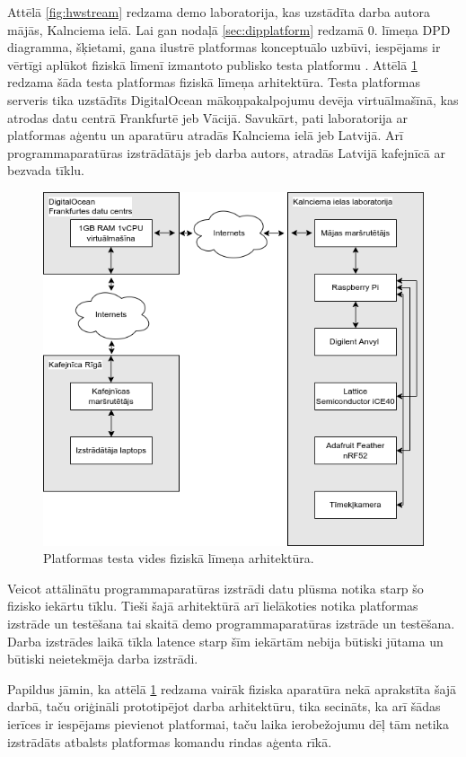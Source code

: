 Attēlā \ref{fig:hwstream} redzama demo laboratorija, kas uzstādīta darba autora
mājās, Kalnciema ielā. Lai gan nodaļā \ref{sec:dipplatform} redzamā 0. līmeņa DPD
diagramma, šķietami, gana ilustrē platformas konceptuālo uzbūvi, iespējams ir
vērtīgi aplūkot fiziskā līmenī izmantoto publisko testa platformu
\cite{VeinbahsKrisjanisProduction}. Attēlā \ref{fig:production} redzama šāda
testa platformas fiziskā līmeņa arhitektūra. Testa platformas serveris tika
uzstādīts DigitalOcean mākoņpakalpojumu devēja virtuālmašīnā, kas atrodas datu
centrā Frankfurtē jeb Vācijā. Savukārt, pati laboratorija ar platformas aģentu
un aparatūru atradās Kalnciema ielā jeb Latvijā. Arī programmaparatūras
izstrādātājs jeb darba autors, atradās Latvijā kafejnīcā ar bezvada tīklu.

\begin{figure}[H]
    \includegraphics[width=0.8\linewidth]{assets/production.drawio.png}
    \centering
    \caption{Platformas testa vides fiziskā līmeņa arhitektūra.}
    \label{fig:production}
\end{figure}

Veicot attālinātu programmaparatūras izstrādi datu plūsma notika starp šo
fizisko iekārtu tīklu. Tieši šajā arhitektūrā arī lielākoties notika platformas
izstrāde un testēšana tai skaitā demo programmaparatūras izstrāde un testēšana.
Darba izstrādes laikā tīkla latence starp šīm iekārtām nebija būtiski jūtama un
būtiski neietekmēja darba izstrādi.

Papildus jāmin, ka attēlā \ref{fig:production} redzama vairāk fiziska aparatūra
nekā aprakstīta šajā darbā, taču oriģināli prototipējot darba arhitektūru, tika
secināts, ka arī šādas ierīces ir iespējams pievienot platformai, taču laika
ierobežojumu dēļ tām netika izstrādāts atbalsts platformas komandu rindas aģenta
rīkā. 

